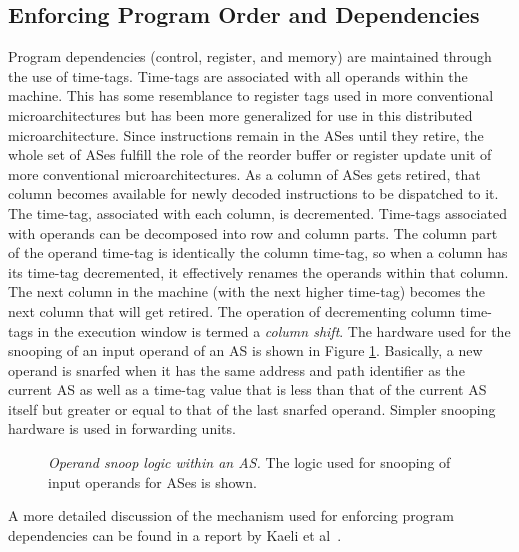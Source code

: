 \documentclass[10pt,twocolumn,dvips]{article}
\begin{document}
\subsection{Enforcing Program Order and Dependencies}
%
Program dependencies (control, register, and memory) are 
maintained through the use of time-tags.
Time-tags are associated with all operands within the machine.
This has some resemblance to register tags used in more conventional 
microarchitectures but has been more generalized for use in this
distributed microarchitecture.  
Since instructions remain in the ASes until
they retire, the whole set of ASes
fulfill the role of the reorder buffer or register update unit of more
conventional microarchitectures.
As a column of ASes gets retired, that column becomes available
for newly decoded instructions to be dispatched to it.
The time-tag, associated with each column, is decremented.
Time-tags associated with operands can be decomposed into row and 
column parts.  The column part of the operand time-tag is
identically the column time-tag, so when a column has its time-tag
decremented, it effectively renames the operands within that column.
The next column in the machine (with the next higher time-tag)
becomes the next column that will get retired.
The operation of decrementing column time-tags 
in the execution window is termed a {\em column shift}.
The hardware used for the snooping of an input operand of an AS
is shown in Figure \ref{fig:source}.
Basically, a new operand is snarfed when it has the same address and
path identifier as the current AS as well as
a time-tag value that is less than that of the current AS itself
but greater or equal to that of the last snarfed operand.
Simpler snooping hardware is used in forwarding units.
%
\begin{figure}
\centering
{}
\caption{{\em Operand snoop logic within an AS.}
The logic used for snooping of input operands for ASes is shown.}
\label{fig:source}
\end{figure}
%
A more detailed discussion of the mechanism used for
enforcing program dependencies
can be found in a report by Kaeli et al~\cite{Kaeli01}.
%
%
\end{document}
